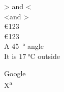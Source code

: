 \documentclass{article}
\begin{document}
> and <     \\
\textless and \textgreater \\
\euro{123} \\
\euro{}123 \\ %

A \SI{45}{\degree} angle \\
It is $\SI{17}{\degreeCelsius}$ outside

Google\texttrademark \\
X\textsuperscript{a}
\end{document}
